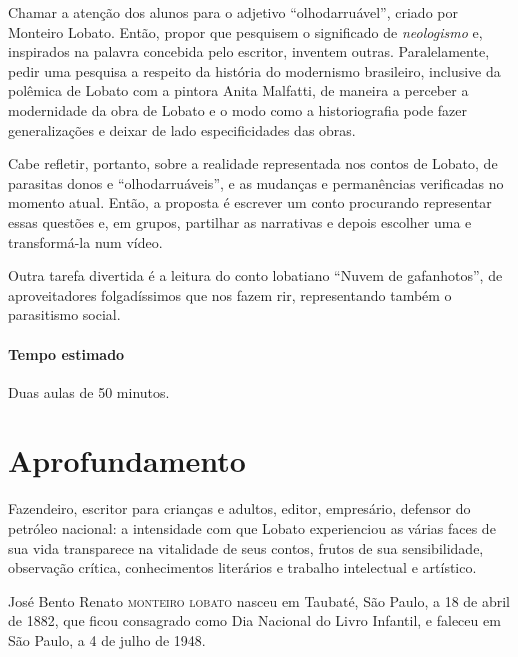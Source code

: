 \documentclass[11pt]{extarticle}
\begin{document}
Chamar a atenção dos alunos para o adjetivo ``olhodarruável'', criado
por Monteiro Lobato. Então, propor que pesquisem o significado de
\emph{neologismo} e, inspirados na palavra concebida pelo escritor,
inventem outras. Paralelamente, pedir uma pesquisa a respeito da
história do modernismo brasileiro, inclusive da polêmica de Lobato com a
pintora Anita Malfatti, de maneira a perceber a modernidade da obra de
Lobato e o modo como a historiografia pode fazer generalizações e deixar
de lado especificidades das obras.

Cabe refletir, portanto, sobre a realidade representada nos contos de
Lobato, de parasitas donos e ``olhodarruáveis'', e as mudanças e
permanências verificadas no momento atual. Então, a proposta é escrever
um conto procurando representar essas questões e, em grupos, partilhar
as narrativas e depois escolher uma e transformá-la num vídeo.


Outra tarefa divertida é a leitura do conto lobatiano ``Nuvem de
gafanhotos'', de aproveitadores folgadíssimos que nos fazem rir,
representando também o parasitismo social.

\paragraph{Tempo estimado} Duas aulas de 50 minutos.

\section{Aprofundamento}


Fazendeiro, escritor para crianças e adultos, editor, empresário,
defensor do petróleo nacional: a intensidade com que Lobato experienciou
as várias faces de sua vida transparece na vitalidade de seus contos,
frutos de sua sensibilidade, observação crítica, conhecimentos
literários e trabalho intelectual e artístico.

José Bento Renato \textsc{monteiro} \textsc{lobato} nasceu em Taubaté, São Paulo, a 18 de
abril de 1882, que ficou consagrado como Dia Nacional do Livro Infantil,
e faleceu em São Paulo, a 4 de julho de 1948.
\end{document}
